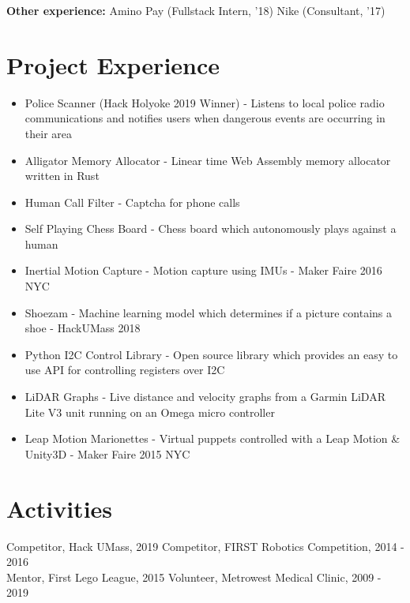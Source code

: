 \documentclass[10pt]{article}
\begin{document}
\begin{flushleft}

    \textbf{Other experience:} Amino Pay (Fullstack Intern, '18) Nike (Consultant, '17)

\section{Project Experience}
    \begin{itemize}
        \item Police Scanner (Hack Holyoke 2019 Winner) - Listens to local police radio communications and notifies users when dangerous events are occurring in their area

        \item Alligator Memory Allocator - Linear time Web Assembly memory allocator written in Rust
    
		\item Human Call Filter - Captcha for phone calls

		\item Self Playing Chess Board - Chess board which autonomously plays against a human

		\item Inertial Motion Capture - Motion capture using IMUs - Maker Faire 2016 NYC

		\item Shoezam - Machine learning model which determines if a picture contains a shoe - HackUMass 2018

		\item Python I2C Control Library - Open source library which provides an easy to use API for controlling 
			registers over I2C

		\item LiDAR Graphs - Live distance and velocity graphs from a Garmin LiDAR Lite V3 unit running on an 
			Omega micro controller

		\item Leap Motion Marionettes - Virtual puppets controlled with a Leap Motion \& Unity3D - Maker Faire 2015 NYC
	\end{itemize}

\section{Activities}
	Competitor, Hack UMass, 2019 \hfill Competitor, FIRST Robotics Competition, 2014 - 2016 \\
	Mentor, First Lego League, 2015 \hfill Volunteer, Metrowest Medical Clinic, 2009 - 2019


\end{flushleft}
\end{document}
